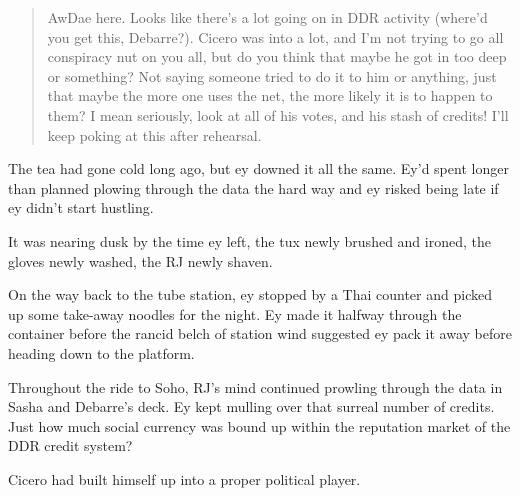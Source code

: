 \begin{quote}
AwDae here. Looks like there's a lot going on in DDR activity (where'd you get this, Debarre?). Cicero was into a lot, and I'm not trying to go all conspiracy nut on you all, but do you think that maybe he got in too deep or something? Not saying someone tried to do it to him or anything, just that maybe the more one uses the net, the more likely it is to happen to them? I mean seriously, look at all of his votes, and his stash of credits! I'll keep poking at this after rehearsal.
\end{quote}

The tea had gone cold long ago, but ey downed it all the same. Ey'd spent longer than planned plowing through the data the hard way and ey risked being late if ey didn't start hustling.

It was nearing dusk by the time ey left, the tux newly brushed and ironed, the gloves newly washed, the RJ newly shaven.

On the way back to the tube station, ey stopped by a Thai counter and picked up some take-away noodles for the night. Ey made it halfway through the container before the rancid belch of station wind suggested ey pack it away before heading down to the platform.

Throughout the ride to Soho, RJ's mind continued prowling through the data in Sasha and Debarre's deck. Ey kept mulling over that surreal number of credits. Just how much social currency was bound up within the reputation market of the DDR credit system?

Cicero had built himself up into a proper political player.
